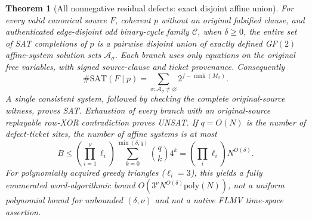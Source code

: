 \documentclass[11pt]{article}
\newtheorem{theorem}{Theorem}
\begin{document}
\begin{theorem}[All nonnegative residual defects: exact disjoint affine union]\label{thm:union}
For every valid canonical source $F$, coherent $p$ without an original falsified clause, and authenticated edge-disjoint odd binary-cycle family $\mathcal C$, when $\delta\ge0$, the entire set of SAT completions of $p$ is a \emph{pairwise disjoint union} of exactly defined GF$(2)$ affine-system solution sets $\mathcal A_\sigma$. Each branch uses only equations on the original free variables, with signed source-clause and ticket provenance. Consequently
\[
\#\mathrm{SAT}(F\mid p)=\sum_{\sigma:\mathcal A_\sigma\ne\varnothing}2^{f-\operatorname{rank}(M_\sigma)}.
\]
A single consistent system, followed by checking the complete original-source witness, proves SAT. Exhaustion of every branch with an original-source replayable row-XOR contradiction proves UNSAT. If $q=O(N)$ is the number of defect-ticket sites, the number of affine systems is at most
\[
B\le\left(\prod_{i=1}^\nu\ell_i\right)
\sum_{k=0}^{\min(\delta,q)}\binom qk4^k
=\left(\prod_i\ell_i\right)N^{O(\delta)}.
\]
For polynomially acquired greedy triangles ($\ell_i=3$), this yields a fully enumerated \emph{word-algorithmic} bound $O(3^\nu N^{O(\delta)}\mathrm{poly}(N))$, not a uniform polynomial bound for unbounded $(\delta,\nu)$ and not a native FLMV time-space assertion.
\end{theorem}
\end{document}
